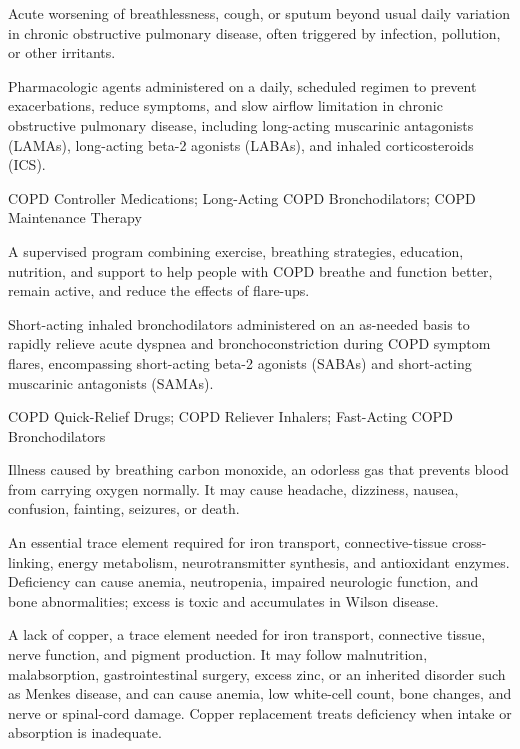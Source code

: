  Acute worsening of breathlessness, cough, or sputum beyond usual daily variation in chronic obstructive pulmonary disease, often triggered by infection, pollution, or other irritants.

 Pharmacologic agents administered on a daily, scheduled regimen to prevent exacerbations, reduce symptoms, and slow airflow limitation in chronic obstructive pulmonary disease, including long-acting muscarinic antagonists (LAMAs), long-acting beta-2 agonists (LABAs), and inhaled corticosteroids (ICS).

\synonyms
COPD Controller Medications; Long-Acting COPD Bronchodilators; COPD Maintenance Therapy

 A supervised program combining exercise, breathing strategies, education, nutrition, and support to help people with COPD breathe and function better, remain active, and reduce the effects of flare-ups.

 Short-acting inhaled bronchodilators administered on an as-needed basis to rapidly relieve acute dyspnea and bronchoconstriction during COPD symptom flares, encompassing short-acting beta-2 agonists (SABAs) and short-acting muscarinic antagonists (SAMAs).

\synonyms
COPD Quick-Relief Drugs; COPD Reliever Inhalers; Fast-Acting COPD Bronchodilators

 Illness caused by breathing carbon monoxide, an odorless gas that prevents blood from carrying oxygen normally. It may cause headache, dizziness, nausea, confusion, fainting, seizures, or death.

 An essential trace element required for iron transport, connective-tissue cross-linking,
energy metabolism, neurotransmitter synthesis, and antioxidant enzymes. Deficiency can
cause anemia, neutropenia, impaired neurologic function, and bone abnormalities; excess
is toxic and accumulates in Wilson disease.

 A lack of copper, a trace element needed for iron transport,
connective tissue, nerve function, and pigment production. It may follow malnutrition,
malabsorption, gastrointestinal surgery, excess zinc, or an inherited disorder such as
Menkes disease, and can cause anemia, low white-cell count, bone changes, and nerve or
spinal-cord damage. Copper replacement treats deficiency when intake or absorption is
inadequate.

